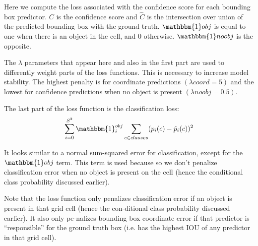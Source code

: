Here we compute the loss associated with the confidence score for each bounding box predictor. $C$ is the confidence score and $\hat{C}$ is the intersection over union of the predicted bounding box with the ground truth. $\mathbbm{1} obj$ is equal to one when there is an object in the cell, and 0 otherwise. $\mathbbm{1} noobj$  is the opposite.

The $\lambda $ parameters that appear here and also in the first part are used to differently weight parts of the loss functions. This is necessary to increase model stability. The highest penalty is for coordinate predictions $(\lambda coord = 5)$ and the lowest for confidence predictions when no object is present $(\lambda noobj = 0.5)$.

The last part of the loss function is the classification loss:
\begin{equation}
  \sum_{i=0}^{S^2} \mathbbm{1}_{i}^{obj}\sum_{c \in classes}(p_i(c) - \hat{p}_i(c))^2
\label{yolo-loss-func-4}
\end{equation}

It looks similar to a normal sum-squared error for classification, except for the $\mathbbm{1} obj$ term. This term is used because so we don’t penalize classification error when no object is present on the cell (hence the conditional class probability discussed earlier).

Note that the loss function only penalizes classification error if an object is present in that grid cell (hence the con-ditional class probability discussed earlier). It also only pe-nalizes bounding box coordinate error if that predictor is “responsible” for the ground truth box (i.e. has the highest IOU of any predictor in that grid cell). \cite{redmon2016look}



{}
\specialsection %
\headerspecialsection

{\hypersetup{urlcolor=ntnu,linkcolor=sophia} %

  
}
